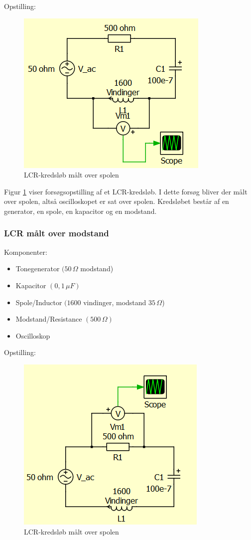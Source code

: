 Opstilling:

\begin{figure}[H]
\centering
\includegraphics[scale=1.25]{Vildledning/Schematics/Kredslb/LCR_spole}
\caption{LCR-kredsløb målt over spolen}
\label{figure:lcrspole}
\end{figure}

Figur \ref{figure:lcrspole} viser forsøgsopstilling af et LCR-kredsløb. I dette forsøg bliver der målt over spolen, altså oscilloskopet er sat over spolen. Kredsløbet består af en generator, en spole, en kapacitor og en modstand.

\subsubsection{LCR målt over modstand}

Komponenter:

\begin{itemize}
\item Tonegenerator $(50\, \Omega$ modstand)
\item Kapacitor $( 0,1\, \mu F)$
\item Spole/Inductor $(1600$ vindinger, modstand $35 \, \Omega$)
\item Modstand/Resistance $(500\, \Omega)$
\item Oscilloskop
\end{itemize}


Opstilling:

\begin{figure}[H]
\centering
\includegraphics[scale=1.25]{Vildledning/Schematics/Kredslb/LCR_modstand}
\caption{LCR-kredsløb målt over spolen}
\label{lcrmodstand}
\end{figure}

